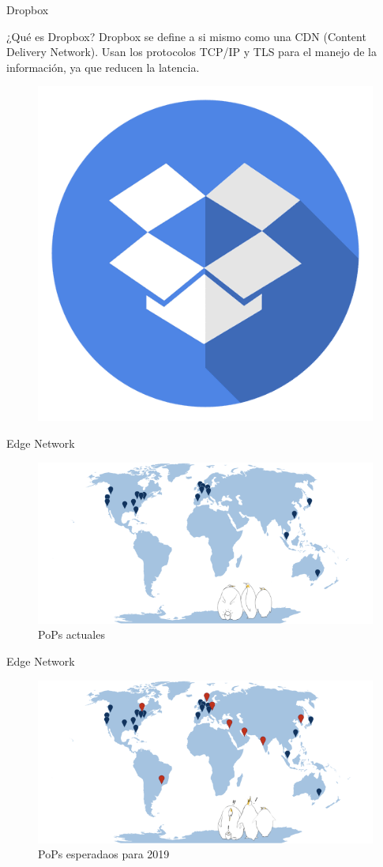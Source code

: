 \documentclass[10pt]{beamer}
\begin{document}
\begin{frame}{Dropbox}
\begin{alertblock}{¿Qué es Dropbox?}
Dropbox se define a si mismo como una CDN (Content Delivery Network). Usan los protocolos TCP/IP y TLS para el manejo de la información, ya que reducen la latencia.
\end{alertblock}
\begin{figure}[h]
  \centering
  \includegraphics[width=0.4\linewidth]{logo2}
\end{figure}
\end{frame}

\begin{frame}{Edge Network}
\begin{figure}[h]
  \centering
  \includegraphics[width=1\linewidth]{pop}
  \caption{PoPs actuales}
\end{figure}

\end{frame}

\begin{frame}{Edge Network}
\begin{figure}[h]
  \centering
  \includegraphics[width=1\linewidth]{pop2}
  \caption{PoPs esperadaos para 2019}
\end{figure}

\end{frame}
\end{document}
